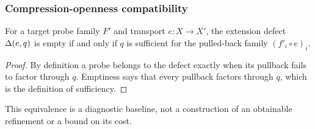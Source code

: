 \subsubsection{Compression-openness compatibility}

\begin{theorem}\label{thm:empty-defect}
For a target probe family $F'$ and transport $e:X\to X'$, the
extension defect $\Delta(e,q)$ is empty if and only if $q$ is
sufficient for the pulled-back family $(f'_i\circ e)_i$.
\end{theorem}
\begin{proof}
By definition a probe belongs to the defect exactly when its
pullback fails to factor through $q$. Emptiness says that every
pullback factors through $q$, which is the definition of sufficiency.
\end{proof}
This equivalence is a diagnostic baseline, not a construction of an
obtainable refinement or a bound on its cost.
